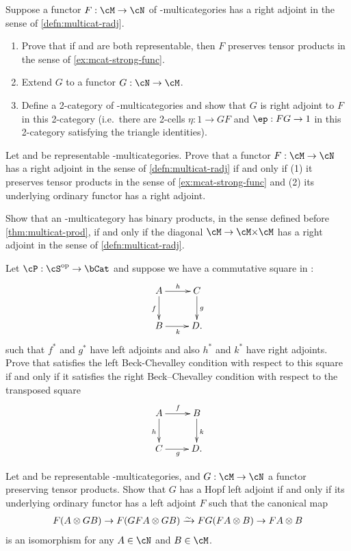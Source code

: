 \begin{ex}\label{ex:multicat-radj}
  Suppose a functor $F:\cM\to\cN$ of \fS-multicategories has a right adjoint in the sense of \cref{defn:multicat-radj}.
  \begin{enumerate}
  \item Prove that if \cM and \cN are both representable, then $F$ preserves tensor products in the sense of \cref{ex:mcat-strong-func}.
  \item Extend $G$ to a functor $G:\cN\to\cM$.
  \item Define a 2-category of \fS-multicategories and show that $G$ is right adjoint to $F$ in this 2-category (i.e.\ there are 2-cells $\eta : 1 \to G F$ and $\ep : F G \to 1$ in this 2-category satisfying the triangle identities).
  \end{enumerate}
\end{ex}

\begin{ex}\label{ex:moncat-radj}
  Let \cM and \cN be representable \fS-multicategories.
  Prove that a functor $F:\cM\to\cN$ has a right adjoint in the sense of \cref{defn:multicat-radj} if and only if (1) it preserves tensor products in the sense of \cref{ex:mcat-strong-func} and (2) its underlying ordinary functor has a right adjoint.
\end{ex}

\begin{ex}\label{ex:multicat-prod-ladj}
  Show that an \fS-multicategory \cM has binary products, in the sense defined before \cref{thm:multicat-prod}, if and only if the diagonal $\cM\to \cM\times \cM$ has a right adjoint in the sense of \cref{defn:multicat-radj}.
\end{ex}

\begin{ex}\label{ex:beck-chev}
  Let $\cP:\cS\op\to\bCat$ and suppose we have a commutative square in \cS:
  \[ \xymatrix{ A \ar[r]^h \ar[d]_f & C \ar[d]^g \\ B \ar[r]_k & D. } \]
  such that $f^*$ and $g^*$ have left adjoints and also $h^*$ and $k^*$ have right adjoints.
  Prove that \cP satisfies the left Beck-Chevalley condition with respect to this square if and only if it satisfies the right Beck--Chevalley condition with respect to the transposed square
  \[ \xymatrix{ A \ar[r]^f \ar[d]_h & B \ar[d]^k \\ C \ar[r]_g & D. } \]
\end{ex}

\begin{ex}\label{ex:hopf-ladj}
  Let \cM and \cN be representable \fS-multicategories, and $G:\cM\to\cN$ a functor preserving tensor products.
  Show that $G$ has a Hopf left adjoint if and only if its underlying ordinary functor has a left adjoint $F$ such that the canonical map
  \begin{gather*}
    F(A\tensor G B) \to F(G F A \tensor G B) \toiso F G(F A \tensor B) \to F A \tensor B
  \end{gather*}
  is an isomorphism for any $A\in\cN$ and $B\in \cM$.
\end{ex}

